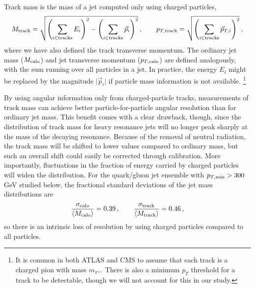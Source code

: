 \documentclass[letterpaper,11pt]{article}
\begin{document}
Track mass is the mass of a jet computed only using charged particles,
%
\begin{equation}
\label{eq:jet-mass-definition}
M_{\rm track} = \sqrt{\left(\sum_{i \in {\rm tracks}} E_i\right)^2 - \left( \sum_{i  \in {\rm tracks}}\vec{p}_i\right)^2}\,, \qquad p_{T,\rm track} = \sqrt{\left(\sum_{i \in {\rm tracks}} \vec{p}_{T,i} \right)^2} \,,
\end{equation}
where we have also defined the track transverse momentum.
%
The ordinary jet mass ($M_{\rm calo}$) and jet transverse momentum ($p_{T,\rm calo}$) are defined analogously, with the sum running over all particles in a jet.
%
In practice, the energy $E_i$ might be replaced by the magnitude $\vert \vec{p}_i\vert$ if particle mass information is not available.%
%
\footnote{It is common in both ATLAS and CMS to assume that each track is a charged pion with mass $m_{\pi^\pm}$.  There is also a minimum $p_T$ threshold for a track to be detectable, though we will not account for this in our study.} 

By using angular information only from charged-particle tracks, measurements of track mass can achieve better particle-for-particle angular resolution than for ordinary jet mass.
%
This benefit comes with a clear drawback, though, since the distribution of track mass for heavy resonance jets will no longer peak sharply at the mass of the decaying resonance.
%
Because of the removal of neutral radiation, the track mass will be shifted to lower values compared to ordinary mass, but such an overall shift could easily be corrected through calibration.
%
More importantly, fluctuations in the fraction of energy carried by charged particles will widen the distribution. 
%
For the quark/gluon jet ensemble with $p_{T,\rm min} > 300$ GeV studied below, the fractional standard deviations of the jet mass distributions are 
\begin{equation}
\frac{\sigma_{\rm calo}}{\langle M_{\rm calo}\rangle } = 0.39\,, \qquad \frac{\sigma_{\rm track}}{\langle M_{\rm track}\rangle } = 0.46\,,
\end{equation}
so there is an intrinsic loss of resolution by using charged particles compared to all particles.
\end{document}

